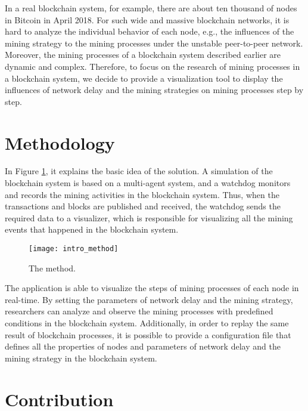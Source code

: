 In a real blockchain system, for example, there are about ten thousand of nodes in Bitcoin in April 2018. For such wide and massive blockchain networks, it is hard to analyze the individual behavior of each node, e.g., the influences of the mining strategy to the mining processes under the unstable peer-to-peer network. Moreover, the mining processes of a blockchain system described earlier are dynamic and complex. Therefore, to focus on the research of mining processes in a blockchain system, we decide to provide a visualization tool to display the influences of network delay and the mining strategies on mining processes step by step.

\section{Methodology}

In Figure \ref{fig:the method}, it explains the basic idea of the solution. A simulation of the blockchain system is based on a multi-agent system, and a watchdog monitors and records the mining activities in the blockchain system. Thus, when the transactions and blocks are published and received, the watchdog sends the required data to a visualizer, which is responsible for visualizing all the mining events that happened in the blockchain system. 

\begin{figure}[htb]
    \centering
    \texttt{[image: intro\_method]}
    \caption{The method.}
    \label{fig:the method}
\end{figure}

The application is able to visualize the steps of mining processes of each node in real-time. By setting the parameters of network delay and the mining strategy, researchers can analyze and observe the mining processes with predefined conditions in the blockchain system. Additionally, in order to replay the same result of blockchain processes, it is possible to provide a configuration file that defines all the properties of nodes and parameters of network delay and the mining strategy in the blockchain system.

\section{Contribution}


